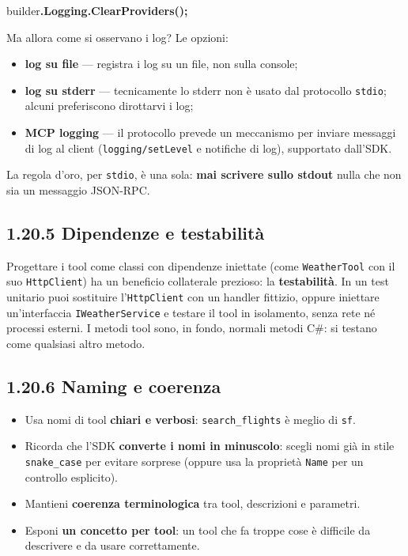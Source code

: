 \documentclass[
  italian,
  10pt,
]{book}
\newenvironment{Shaded}{\begin{snugshade}}{\end{snugshade}}
\newcommand{\FunctionTok}[1]{\textcolor[rgb]{0.13,0.29,0.53}{\textbf{#1}}}
\newcommand{\NormalTok}[1]{#1}
\newcommand{\OperatorTok}[1]{\textcolor[rgb]{0.81,0.36,0.00}{\textbf{#1}}}
\providecommand{\tightlist}{%
  \setlength{\itemsep}{0pt}\setlength{\parskip}{0pt}}
\begin{document}
\begin{Shaded}
\begin{Highlighting}[]
\NormalTok{builder}\OperatorTok{.}\FunctionTok{Logging}\OperatorTok{.}\FunctionTok{ClearProviders}\OperatorTok{();}
\end{Highlighting}
\end{Shaded}

Ma allora come si osservano i log? Le opzioni:

\begin{itemize}
\tightlist
\item
  \textbf{log su file} --- registra i log su un file, non sulla console;
\item
  \textbf{log su stderr} --- tecnicamente lo stderr non è usato dal
  protocollo \texttt{stdio}; alcuni preferiscono dirottarvi i log;
\item
  \textbf{MCP logging} --- il protocollo prevede un meccanismo per
  inviare messaggi di log al client (\texttt{logging/setLevel} e
  notifiche di log), supportato dall'SDK.
\end{itemize}

La regola d'oro, per \texttt{stdio}, è una sola: \textbf{mai scrivere
sullo stdout} nulla che non sia un messaggio JSON-RPC.

\subsection{1.20.5 Dipendenze e
testabilità}\label{dipendenze-e-testabilituxe0}

Progettare i tool come classi con dipendenze iniettate (come
\texttt{WeatherTool} con il suo \texttt{HttpClient}) ha un beneficio
collaterale prezioso: la \textbf{testabilità}. In un test unitario puoi
sostituire l'\texttt{HttpClient} con un handler fittizio, oppure
iniettare un'interfaccia \texttt{IWeatherService} e testare il tool in
isolamento, senza rete né processi esterni. I metodi tool sono, in
fondo, normali metodi C\#: si testano come qualsiasi altro metodo.

\subsection{1.20.6 Naming e coerenza}\label{naming-e-coerenza}

\begin{itemize}
\tightlist
\item
  Usa nomi di tool \textbf{chiari e verbosi}: \texttt{search\_flights} è
  meglio di \texttt{sf}.
\item
  Ricorda che l'SDK \textbf{converte i nomi in minuscolo}: scegli nomi
  già in stile \texttt{snake\_case} per evitare sorprese (oppure usa la
  proprietà \texttt{Name} per un controllo esplicito).
\item
  Mantieni \textbf{coerenza terminologica} tra tool, descrizioni e
  parametri.
\item
  Esponi \textbf{un concetto per tool}: un tool che fa troppe cose è
  difficile da descrivere e da usare correttamente.
\end{itemize}
\end{document}
